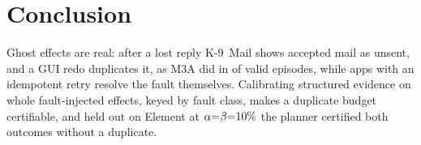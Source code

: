 \section{Conclusion}
\label{sec:conclusion}
Ghost effects are real: after a lost reply K-9~Mail shows accepted mail as unsent, and a GUI redo duplicates it, as M3A did in \AgentDupN{} of \AgentValidN{} valid episodes, while apps with an idempotent
retry resolve the fault themselves. Calibrating structured evidence on whole fault-injected effects, keyed by fault class, makes a duplicate budget certifiable, and held out on Element at $\alpha{=}\beta{=}10\%$ the planner certified both outcomes without a duplicate.

